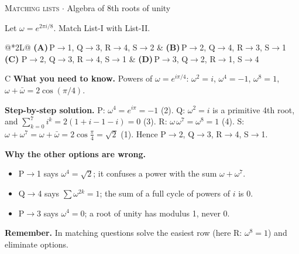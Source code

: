 \documentclass[11pt,a4paper]{article}
\newcommand{\optlabel}[1]{\textbf{(#1)}}
\newcommand{\correctlabel}[1]{\textcolor{okgreen}{\textbf{(#1)}\,\ding{51}}}
\newenvironment{qitem}[1]{\begin{list}{}{\setlength{\leftmargin}{3.3em}\setlength{\labelwidth}{3.1em}%
  \setlength{\labelsep}{0.2em}\setlength{\topsep}{3pt}\setlength{\parsep}{3pt}}\item[\textbf{Q.#1}\hfill]}{\end{list}}
\newcommand{\qsep}{\par\vspace{2pt}{\color{black!15}\hrule}\vspace{4pt}}
\newcommand{\qmeta}[2]{{\footnotesize\color{black!60}\textsc{#1} \;$\cdot$\; #2}\par}
\begin{document}
\begin{qitem}{15}
\qmeta{Matching lists}{Algebra of 8th roots of unity}
Let $\omega = e^{2\pi i/8}$. Match List-I with List-II.
\par\smallskip{}
\par\smallskip\noindent\begin{tabularx}{\linewidth}{@{}*{2}{L}@{}}
\optlabel{A}\,P$\to$1, Q$\to$3, R$\to$4, S$\to$2 & \optlabel{B}\,P$\to$2, Q$\to$4, R$\to$3, S$\to$1 \\[3pt]
\correctlabel{C}\,P$\to$2, Q$\to$3, R$\to$4, S$\to$1 & \optlabel{D}\,P$\to$3, Q$\to$2, R$\to$1, S$\to$4
\end{tabularx}
\end{qitem}
\begin{solbox}{C}
\textbf{\color{brand}What you need to know.} Powers of $\omega = e^{i\pi/4}$: $\omega^2 = i$, $\omega^4 = -1$, $\omega^8 = 1$, $\omega + \bar\omega = 2\cos(\pi/4)$.

\textbf{\color{brand}Step-by-step solution.} P: $\omega^4 = e^{i\pi} = -1$ (2). Q: $\omega^2 = i$ is a primitive 4th root, and $\sum_{k=0}^{7} i^k = 2(1 + i - 1 - i) = 0$ (3).
R: $\omega\,\omega^7 = \omega^8 = 1$ (4). S: $\omega + \omega^7 = \omega + \bar\omega = 2\cos\frac{\pi}{4} = \sqrt2$ (1).
Hence P$\to$2, Q$\to$3, R$\to$4, S$\to$1.

\textbf{\color{brand}Why the other options are wrong.}
\begin{itemize}[leftmargin=2.4em, itemsep=1pt, topsep=2pt]
\item[\textbf{(A)}] P$\to$1 says $\omega^4 = \sqrt2$; it confuses a power with the sum $\omega + \omega^7$.
\item[\textbf{(B)}] Q$\to$4 says $\sum\omega^{2k} = 1$; the sum of a full cycle of powers of $i$ is $0$.
\item[\textbf{(D)}] P$\to$3 says $\omega^4 = 0$; a root of unity has modulus 1, never 0.
\end{itemize}
\textbf{\color{brand}Remember.} In matching questions solve the easiest row (here R: $\omega^8 = 1$) and eliminate options.
\end{solbox}
\qsep
\end{document}
